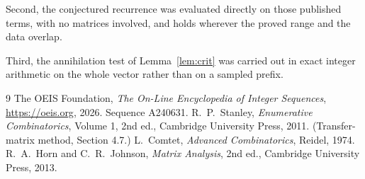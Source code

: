 \documentclass[11pt,a4paper]{article}
\theoremstyle{plain}
\theoremstyle{definition}
\begin{document}
Second, the conjectured recurrence was evaluated directly on those published terms, with no
matrices involved, and holds wherever the proved range and the data overlap.

Third, the annihilation test of Lemma~\ref{lem:crit} was carried out in exact integer
arithmetic on the whole vector rather than on a sampled prefix.

\begin{thebibliography}{9}
 The OEIS Foundation, \emph{The On-Line Encyclopedia of Integer
Sequences}, \url{https://oeis.org}, 2026. Sequence A240631.
 R.~P.~Stanley, \emph{Enumerative Combinatorics}, Volume 1, 2nd ed.,
Cambridge University Press, 2011. (Transfer-matrix method, Section 4.7.)
 L.~Comtet, \emph{Advanced Combinatorics}, Reidel, 1974.
 R.~A.~Horn and C.~R.~Johnson, \emph{Matrix Analysis}, 2nd ed., Cambridge
University Press, 2013.
\end{thebibliography}
\end{document}
